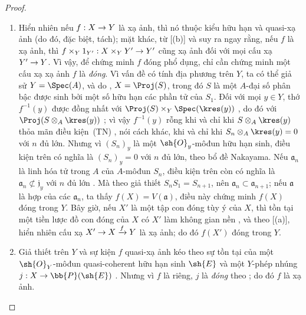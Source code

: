 \documentclass[oneside,10pt]{amsart}
\makeatletter
\newcommand{\ega@arrow}[2]{\mathchoice{#1}{#2}{#2}{#2}}
\renewcommand{\to}{\ega@arrow{\longrightarrow}{\rightarrow}}
\makeatother
\begin{document}
\begin{proof}
\medskip\noindent
\begin{enumerate}
  \item[(i)] Hiển nhiên nếu $f:X\to Y$ là xạ ảnh, thì nó thuộc kiểu hữu hạn và quasi-xạ ảnh (do đó, đặc biệt, tách); mặt khác, từ [(b)] và  suy ra ngay rằng, nếu $f$ là xạ ảnh, thì $f\times_Y 1_{Y'}:X\times_Y Y'\to Y'$ cũng xạ ảnh đối với mọi cấu xạ $Y'\to Y$.
    Vì vậy, để chứng minh $f$ đóng phổ dụng, chỉ cần chứng minh một cấu xạ xạ ảnh $f$ là \emph{đóng}.
    Vì vấn đề có tính địa phương trên $Y$, ta có thể giả sử $Y=\Spec(A)$, và do , $X=\Proj(S)$, trong đó $S$ là một $A$-đại số phân bậc được sinh bởi một số hữu hạn các phần tử của $S_1$.
    Đối với mọi $y\in Y$, thớ $f^{-1}(y)$ được đồng nhất với $\Proj(S)\times_Y\Spec(\kres(y))$ , do đó với $\Proj(S\otimes_A\kres(y))$ ;
    vì vậy $f^{-1}(y)$ rỗng khi và chỉ khi $S\otimes_A\kres(y)$ thỏa mãn điều kiện~(TN) , nói cách khác, khi và chỉ khi $S_n\otimes_A\kres(y)=0$ với $n$ đủ lớn.
    Nhưng vì $(S_n)_y$ là một $\sh{O}_y$-môđun hữu hạn sinh, điều kiện trên có nghĩa là $(S_n)_y=0$ với $n$ đủ lớn, theo bổ đề Nakayama.
    Nếu $\mathfrak{a}_n$ là linh hóa tử trong $A$ của $A$-môđun $S_n$, điều kiện trên còn có nghĩa là $\mathfrak{a}_n\not\subset\mathfrak{j}_y$ với $n$ đủ lớn .
    Mà theo giả thiết $S_nS_1=S_{n+1}$, nên $\mathfrak{a}_n\subset\mathfrak{a}_{n+1}$; nếu $\mathfrak{a}$ là hợp của các $\mathfrak{a}_n$, ta thấy $f(X)=V(\mathfrak{a})$, điều này chứng minh $f(X)$ đóng trong $Y$.
    Bây giờ, nếu $X'$ là một tập con đóng tùy ý của $X$, thì tồn tại một tiền lược đồ con đóng của $X$ có $X'$ làm không gian nền , và theo [(a)], hiển nhiên cấu xạ $X'\to X\xrightarrow{f}Y$ là xạ ảnh; do đó $f(X')$ đóng trong $Y$.
  \item[(ii)] Giả thiết trên $Y$ và sự kiện $f$ quasi-xạ ảnh kéo theo sự tồn tại của một $\sh{O}_Y$-môđun quasi-coherent hữu hạn sinh $\sh{E}$ và một $Y$-phép nhúng $j:X\to\bb{P}(\sh{E})$ .
    Nhưng vì $f$ là riêng, $j$ là \emph{đóng} theo ; do đó $f$ là xạ ảnh.
\end{enumerate}
\end{proof}
\end{document}
